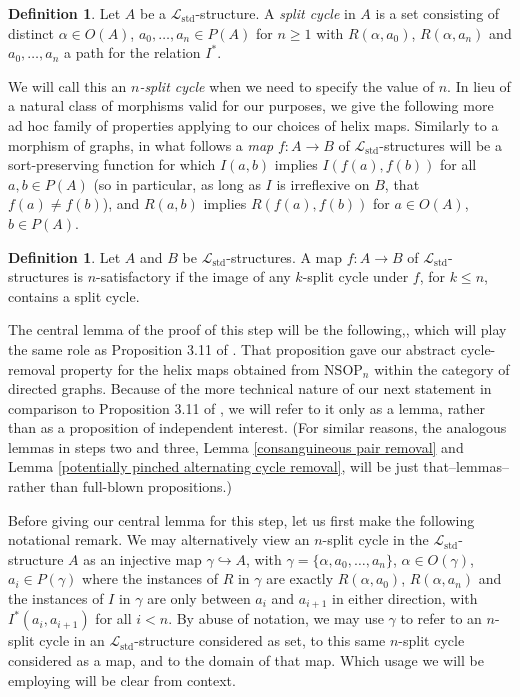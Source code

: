 \documentclass{amsart}
\theoremstyle{definition}
\newtheorem{definition}[theorem]{Definition}
\theoremstyle{remark}
\numberwithin{equation}{section}
\begin{document}
\begin{definition}
   \label{split cycle} Let $A$ be a $\mathcal{L}_{\mathrm{std}}$-structure. A \textit{split cycle} in $A$ is a set consisting of distinct $\alpha \in O(A)$, $a_0, \ldots, a_{n} \in P(A)$ for $n \geq 1$ with $R(\alpha, a_0)$, $R(\alpha, a_{n})$ and $a_0, \ldots, a_{n}$ a path for the relation $I^{*}$.
\end{definition}


We will call this an \textit{$n$-split cycle} when we need to specify the value of $n$. In lieu of a natural class of morphisms valid for our purposes, we give the following more ad hoc family of properties applying to our choices of helix maps. Similarly to a morphism of graphs, in what follows a \textit{map} $f: A \to B$ of $\mathcal{L}_{\mathrm{std}}$-structures will be a sort-preserving function for which $I(a, b)$ implies $I(f(a), f(b))$ for all $a, b \in P(A)$ (so in particular, as long as $I$ is irreflexive on $B$, that $f(a) \neq f(b)$), and $R(a, b)$ implies $R(f(a), f(b))$ for $a \in O(A)$, $b \in P(A)$.


\begin{definition}
\label{n-satisfactory}    Let $A$ and $B$ be $\mathcal{L}_{\mathrm{std}}$-structures. A map $f: A \to B$ of $\mathcal{L}_{\mathrm{std}}$-structures is $\textit{n}$-satisfactory if the image of any $k$-split cycle under $f$, for $k \leq n$, contains a split cycle.
\end{definition}

The central lemma of the proof of this step will be the following,, which will play the same role as Proposition 3.11 of \cite{ApproxOrder}. That proposition gave our abstract cycle-removal property for the helix maps obtained from $\mathrm{NSOP}_{n}$ within the category of directed graphs. Because of the more technical nature of our next statement in comparison to Proposition 3.11 of \cite{ApproxOrder}, we will refer to it only as a lemma, rather than as a proposition of independent interest. (For similar reasons, the analogous lemmas in steps two and three, Lemma \ref{consanguineous pair removal} and Lemma \ref{potentially pinched alternating cycle removal}, will be just that--lemmas--rather than full-blown propositions.) 

Before giving our central lemma for this step, let us first make the following notational remark. We may alternatively view an $n$-split cycle in the $\mathcal{L}_{\mathrm{std}}$-structure $A$ as an injective map $\gamma \hookrightarrow A$, with $\gamma = \{\alpha, a_0, \ldots, a_{n}\}$, $\alpha \in O(\gamma)$, $a_i \in P(\gamma)$ where the instances of $R$ in $\gamma$ are exactly $R(\alpha, a_0)$, $R(\alpha, a_n)$ and the instances of $I$ in $\gamma$ are only between $a_i$ and $a_{i+1}$ in either direction, with $I^{*}(a_i, a_{i+1})$ for all $i < n$. By abuse of notation, we may use $\gamma$ to refer to an $n$-split cycle in an $\mathcal{L}_{\mathrm{std}}$-structure considered as set, to this same $n$-split cycle considered as a map, and to the domain of that map. Which usage we will be employing will be clear from context.
\end{document}
